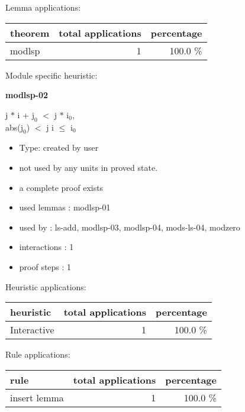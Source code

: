 \documentclass[a4paper]{article}
\begin{document}
Lemma applications:

\begin{supertabular}{l|r|r}
theorem	        & total applications & percentage \\ \hline
modlsp & 1 & 100.0 \% \\

\end{supertabular}

Module specific heuristic:

\pagebreak

{\LARGE\bf modlsp-02}\label{lemma-modlsp-02}

\medskip

j $*$ i + $\mbox{j}_{0}$ $<$ j $*$ $\mbox{i}_{0}$, \\
abs($\mbox{j}_{0}$) $<$ j \Fol i $\le$ $\mbox{i}_{0}$

\begin{itemize}

\item Type: created by user

\item not used by any units in proved state.
\item       a complete proof exists
\item       used lemmas  : modlsp-01
\item       used by      : ls-add, modlsp-03, modlsp-04, mods-ls-04, modzero
\item       interactions : 1
\item       proof steps  : 1
\end{itemize}

\medskip


Heuristic applications:

\begin{supertabular}{l|r|r}
heuristic	& total applications & percentage \\ \hline
Interactive & 1 & 100.0 \% \\

\end{supertabular}

Rule applications:

\begin{supertabular}{l|r|r}
rule	        & total applications & percentage \\ \hline
insert lemma & 1 & 100.0 \% \\

\end{supertabular}
\end{document}
